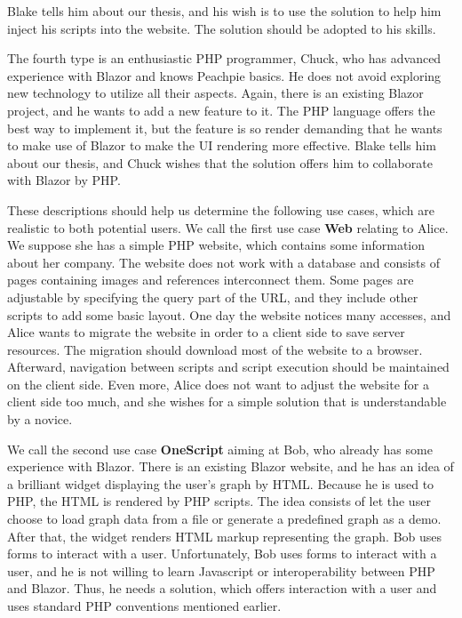 Blake tells him about our thesis, and his wish is to use the solution to help him inject his scripts into the website.
The solution should be adopted to his skills.
\par
The fourth type is an enthusiastic PHP programmer, Chuck, who has advanced experience with Blazor and knows Peachpie basics.
He does not avoid exploring new technology to utilize all their aspects.
Again, there is an existing Blazor project, and he wants to add a new feature to it.
The PHP language offers the best way to implement it, but the feature is so render demanding that he wants to make use of Blazor to make the UI rendering more effective.
Blake tells him about our thesis, and Chuck wishes that the solution offers him to collaborate with Blazor by PHP.
\par
These descriptions should help us determine the following use cases, which are realistic to both potential users.
We call the first use case \textbf{Web} relating to Alice.
We suppose she has a simple PHP website, which contains some information about her company.
The website does not work with a database and consists of pages containing images and references interconnect them.
Some pages are adjustable by specifying the query part of the URL, and they include other scripts to add some basic layout.
One day the website notices many accesses, and Alice wants to migrate the website in order to a client side to save server resources.
The migration should download most of the website to a browser.
Afterward, navigation between scripts and script execution should be maintained on the client side.
Even more, Alice does not want to adjust the website for a client side too much, and she wishes for a simple solution that is understandable by a novice.
\par
We call the second use case \textbf{OneScript} aiming at Bob, who already has some experience with Blazor.
There is an existing Blazor website, and he has an idea of a brilliant widget displaying the user's graph by HTML.
Because he is used to PHP, the HTML is rendered by PHP scripts.
The idea consists of let the user choose to load graph data from a file or generate a predefined graph as a demo.
After that, the widget renders HTML markup representing the graph.
Bob uses forms to interact with a user.
Unfortunately, Bob uses forms to interact with a user, and he is not willing to learn Javascript or interoperability between PHP and Blazor.
Thus, he needs a solution, which offers interaction with a user and uses standard PHP conventions mentioned earlier.
\par

